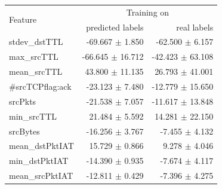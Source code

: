 \documentclass[10pt,sigconf,letterpaper]{acmart}
\begin{document}
\begin{table}
\begin{tabular}{l r r}
\bottomrule
\end{tabular} \qquad
 \begin{tabular}{l r r} \toprule 
\multirow{2}{*}{Feature} & \multicolumn{2}{c}{Training on} \\
  & predicted labels & real labels \\ \midrule
        stdev\_dstTTL &  -69.667 $\pm$ 1.850 &  -62.500 $\pm$ 6.157 \\
         max\_srcTTL &  -66.645 $\pm$ 16.712 &  -42.423 $\pm$ 63.108 \\
        mean\_srcTTL &   43.800 $\pm$ 11.135 &   26.793 $\pm$ 41.001 \\
    \#srcTCPflag:ack &  -23.123 $\pm$ 7.480 &  -12.779 $\pm$ 15.650 \\
             srcPkts &  -21.538 $\pm$ 7.057 &  -11.617 $\pm$ 13.848 \\
         min\_srcTTL &   21.484 $\pm$ 5.592 &   14.281 $\pm$ 22.150 \\
            srcBytes &  -16.256 $\pm$ 3.767 &   -7.455 $\pm$ 4.132 \\
     mean\_dstPktIAT &   15.729 $\pm$ 0.866 &    9.278 $\pm$ 4.046 \\
      min\_dstPktIAT &  -14.390 $\pm$ 0.935 &   -7.674 $\pm$ 4.117 \\
     mean\_srcPktIAT &  -12.811 $\pm$ 0.429 &   -7.396 $\pm$ 4.275 \\

\end{tabular}
\end{table}
\end{document}
